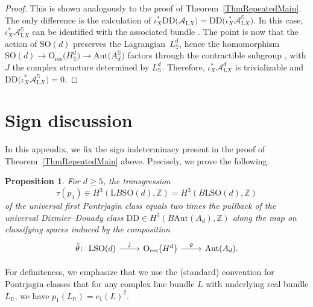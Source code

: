 \documentclass[pdftex]{sigma}
\numberwithin{equation}{section}
\newtheorem{Proposition}[Theorem]{Proposition}
\newcommand{\R}{\mathbb{R}}
\newcommand{\Z}{\mathbb{Z}}
\newcommand{\SO}{\mathrm{SO}}
\newcommand{\res}{\mathrm{res}}
\newcommand{\Aut}{\mathrm{Aut}}
\newcommand{\U}{\mathrm{U}}
\renewcommand{\O}{\mathrm{O}}
\renewcommand{\L}{\mathrm{L}}
\newcommand{\DD}{\mathrm{DD}}
\begin{document}
\begin{proof}
This is shown analogously to the proof of Theorem~\ref{ThmRepeatedMain}.
The only difference is the calculation of $\iota_X^* \DD\big(\mathcal{A}_{\L X}\big) = \DD\big(\iota_X^*\mathcal{A}_{\L X}^{\mathbb{S}}\big)$.
In this case, $\iota_X^*\mathcal{A}_{\L X}^{\mathbb{S}}$ can be identified with the associated bundle \smash{$\SO(X) \times_{\SO(d)} A_d^{\mathbb{S}}$}.
The point is now that the action of $\SO(d)$ preserves the Lagrangian~$L^d_{\mathbb{S}}$, hence the homomorphism $\SO(d) \to \O_{\res}\big(H^d_{\mathbb{S}}\big) \to \Aut\big(A_d^{\mathbb{S}}\big)$ factors through the contractible subgroup \smash{$\U\big(\big(H^d_{\mathbb{S}}\big)_J\big)$}, with $J$ the complex structure determined by $L^d_{\mathbb{S}}$.
Therefore, ${\iota_X^*\mathcal{A}_{\L X}^d}$ is trivializable and $\DD\big(\iota_X^*\mathcal{A}_{\L X}^{\mathbb{S}}\big)=0$.
\end{proof}

\appendix

\section{Sign discussion}
\label{AppendixSign}

In this appendix, we fix the sign indeterminacy present in the proof of Theorem~\ref{ThmRepeatedMain} above.
Precisely, we prove the following.

\begin{Proposition}
\label{SignProposition}
For $d\geq 5$, the transgression
\begin{equation*}
\tau(p_1) \in H^3(\L B\SO(d), \Z) = H^3(B\L\SO(d), \Z)
\end{equation*}
of the universal first Pontrjagin class equals two times the pullback of the universal Dixmier--Douady class $\DD \in H^3(B\Aut(A_d), \Z)$ along the map on classifying spaces induced by the composition
\begin{equation*}
\begin{tikzcd}
\tilde{\theta} \colon\ \L\SO(d) \ar[r, "j"] & \O_{\mathrm{res}}\big(H^d\big) \ar[r, "\theta"] & \Aut(A_d).
\end{tikzcd}
\end{equation*}
\end{Proposition}

For definiteness, we emphasize that we use the (standard) convention for Pontrjagin classes that for any complex line bundle $L$ with underlying real bundle $L_\R$, we have $p_1(L_\R) = c_1(L)^2$.
\end{document}

